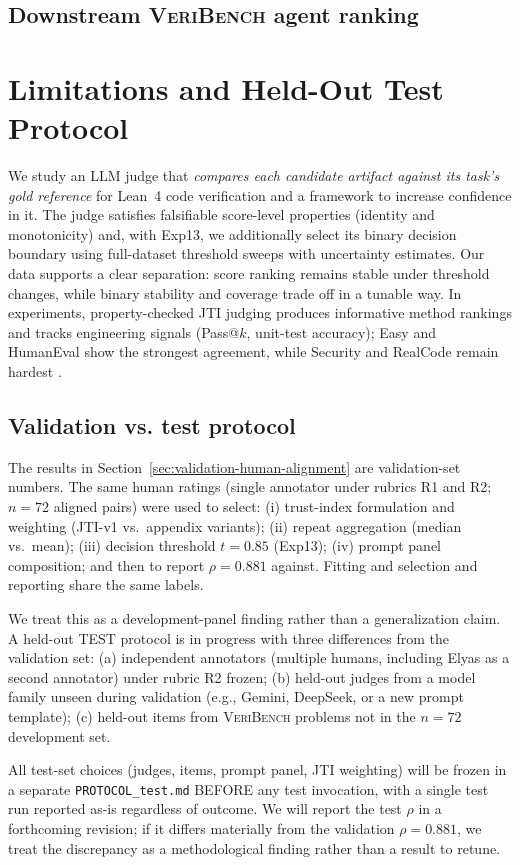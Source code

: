 \documentclass{article}
\begin{document}
\subsection{Downstream \textsc{VeriBench} agent ranking}
\section{Limitations and Held-Out Test Protocol}
We study an LLM judge that \emph{compares each candidate artifact against its task’s gold reference} for Lean~4 code verification and a framework to increase confidence in it.
The judge satisfies falsifiable score-level properties (identity and monotonicity) and, with Exp13, we additionally select its binary decision boundary using full-dataset threshold sweeps with uncertainty estimates.
Our data supports a clear separation: score ranking remains stable under threshold changes, while binary stability and coverage trade off in a tunable way.
In experiments, property-checked JTI judging produces informative method rankings and tracks engineering signals (Pass@$k$, unit-test accuracy); Easy and HumanEval show the strongest agreement, while Security and RealCode remain hardest \citep{chen2021evaluating}.

\subsection{Validation vs. test protocol}
The results in Section~\ref{sec:validation-human-alignment} are validation-set numbers.
The same human ratings (single annotator under rubrics R1 and R2; \(n=72\) aligned pairs) were used to select:
(i) trust-index formulation and weighting (JTI-v1 vs.\ appendix variants);
(ii) repeat aggregation (median vs.\ mean);
(iii) decision threshold \(t=0.85\) (Exp13);
(iv) prompt panel composition;
and then to report \(\rho=0.881\) against.
Fitting and selection and reporting share the same labels.

We treat this as a development-panel finding rather than a generalization claim.
A held-out TEST protocol is in progress with three differences from the validation set:
(a) independent annotators (multiple humans, including Elyas as a second annotator) under rubric R2 frozen;
(b) held-out judges from a model family unseen during validation (e.g., Gemini, DeepSeek, or a new prompt template);
(c) held-out items from \textsc{VeriBench} problems not in the \(n=72\) development set.

All test-set choices (judges, items, prompt panel, JTI weighting) will be frozen in a separate \texttt{PROTOCOL\_test.md} BEFORE any test invocation, with a single test run reported as-is regardless of outcome.
We will report the test \(\rho\) in a forthcoming revision; if it differs materially from the validation \(\rho=0.881\), we treat the discrepancy as a methodological finding rather than a result to retune.
\end{document}
